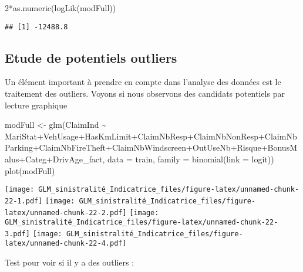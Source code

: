 \documentclass[
]{article}
\newenvironment{Shaded}{\begin{snugshade}}{\end{snugshade}}
\newcommand{\AttributeTok}[1]{\textcolor[rgb]{0.77,0.63,0.00}{#1}}
\newcommand{\DecValTok}[1]{\textcolor[rgb]{0.00,0.00,0.81}{#1}}
\newcommand{\FunctionTok}[1]{\textcolor[rgb]{0.00,0.00,0.00}{#1}}
\newcommand{\NormalTok}[1]{#1}
\newcommand{\OtherTok}[1]{\textcolor[rgb]{0.56,0.35,0.01}{#1}}
\newcommand{\SpecialCharTok}[1]{\textcolor[rgb]{0.00,0.00,0.00}{#1}}
\begin{document}
\begin{Shaded}
\begin{Highlighting}[]
\DecValTok{2}\SpecialCharTok{*}\FunctionTok{as.numeric}\NormalTok{(}\FunctionTok{logLik}\NormalTok{(modFull))}
\end{Highlighting}
\end{Shaded}

\begin{verbatim}
## [1] -12488.8
\end{verbatim}

\hypertarget{etude-de-potentiels-outliers}{%
\subsection{Etude de potentiels
outliers}\label{etude-de-potentiels-outliers}}

Un élément important à prendre en compte dans l'analyse des données est
le traitement des outliers. Voyons si nous observons des candidats
potentiels par lecture graphique

\begin{Shaded}
\begin{Highlighting}[]
\NormalTok{modFull }\OtherTok{\textless{}{-}} \FunctionTok{glm}\NormalTok{(ClaimInd }\SpecialCharTok{\textasciitilde{}}\NormalTok{ MariStat}\SpecialCharTok{+}\NormalTok{VehUsage}\SpecialCharTok{+}\NormalTok{HasKmLimit}\SpecialCharTok{+}\NormalTok{ClaimNbResp}\SpecialCharTok{+}\NormalTok{ClaimNbNonResp}\SpecialCharTok{+}\NormalTok{ClaimNbParking}\SpecialCharTok{+}\NormalTok{ClaimNbFireTheft}\SpecialCharTok{+}\NormalTok{ClaimNbWindscreen}\SpecialCharTok{+}\NormalTok{OutUseNb}\SpecialCharTok{+}\NormalTok{Risque}\SpecialCharTok{+}\NormalTok{BonusMalus}\SpecialCharTok{+}\NormalTok{Categ}\SpecialCharTok{+}\NormalTok{DrivAge\_fact, }\AttributeTok{data =}\NormalTok{ train, }\AttributeTok{family =} \FunctionTok{binomial}\NormalTok{(}\AttributeTok{link =}\NormalTok{ logit))}
\FunctionTok{plot}\NormalTok{(modFull)}
\end{Highlighting}
\end{Shaded}

\texttt{[image: GLM\_sinistralité\_Indicatrice\_files/figure-latex/unnamed-chunk-22-1.pdf]}
\texttt{[image: GLM\_sinistralité\_Indicatrice\_files/figure-latex/unnamed-chunk-22-2.pdf]}
\texttt{[image: GLM\_sinistralité\_Indicatrice\_files/figure-latex/unnamed-chunk-22-3.pdf]}
\texttt{[image: GLM\_sinistralité\_Indicatrice\_files/figure-latex/unnamed-chunk-22-4.pdf]}

Test pour voir si il y a des outliers :
\end{document}
